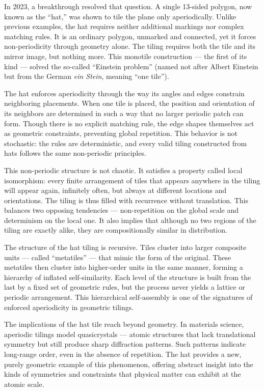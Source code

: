 In 2023, a breakthrough resolved that question. A single 13-sided polygon, now known as the “hat,” was shown to tile the plane only aperiodically. Unlike previous examples, the hat requires neither additional markings nor complex matching rules. It is an ordinary polygon, unmarked and connected, yet it forces non-periodicity through geometry alone. The tiling requires both the tile and its mirror image, but nothing more. This monotile construction — the first of its kind — solved the so-called “Einstein problem” (named not after Albert Einstein but from the German \emph{ein Stein}, meaning “one tile”).

The hat enforces aperiodicity through the way its angles and edges constrain neighboring placements. When one tile is placed, the position and orientation of its neighbors are determined in such a way that no larger periodic patch can form. Though there is no explicit matching rule, the edge shapes themselves act as geometric constraints, preventing global repetition. This behavior is not stochastic: the rules are deterministic, and every valid tiling constructed from hats follows the same non-periodic principles.

This non-periodic structure is not chaotic. It satisfies a property called local isomorphism: every finite arrangement of tiles that appears anywhere in the tiling will appear again, infinitely often, but always at different locations and orientations. The tiling is thus filled with recurrence without translation. This balances two opposing tendencies — non-repetition on the global scale and determinism on the local one. It also implies that although no two regions of the tiling are exactly alike, they are compositionally similar in distribution.

The structure of the hat tiling is recursive. Tiles cluster into larger composite units — called “metatiles” — that mimic the form of the original. These metatiles then cluster into higher-order units in the same manner, forming a hierarchy of inflated self-similarity. Each level of the structure is built from the last by a fixed set of geometric rules, but the process never yields a lattice or periodic arrangement. This hierarchical self-assembly is one of the signatures of enforced aperiodicity in geometric tilings.

The implications of the hat tile reach beyond geometry. In materials science, aperiodic tilings model quasicrystals — atomic structures that lack translational symmetry but still produce sharp diffraction patterns. Such patterns indicate long-range order, even in the absence of repetition. The hat provides a new, purely geometric example of this phenomenon, offering abstract insight into the kinds of symmetries and constraints that physical matter can exhibit at the atomic scale.

